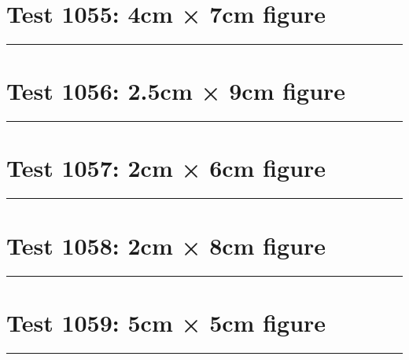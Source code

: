 \documentclass[a4paper,11pt]{article}
\begin{document}
\section*{Test 1055: 4cm × 7cm figure}
\begin{swarmwrap}%
  \begin{minipage}[t]{4cm}
    \centering
    \rule{\linewidth}{7cm}
  \end{minipage}%
\end{swarmwrap}%
\swarmwrapnext
\lipsum[13]
\lipsum[14]
\lipsum[15]
\section*{Test 1056: 2.5cm × 9cm figure}
\begin{swarmwrap}%
  \begin{minipage}[t]{2cm}
    \centering
    \rule{\linewidth}{9cm}
  \end{minipage}%
\end{swarmwrap}%
\swarmwrapnext
\lipsum[106]
\lipsum[107]
\lipsum[108]
\lipsum[109]
\section*{Test 1057: 2cm × 6cm figure}
\begin{swarmwrap}%
  \begin{minipage}[t]{2cm}
    \centering
    \rule{\linewidth}{6cm}
  \end{minipage}%
\end{swarmwrap}%
\swarmwrapnext
\lipsum[50]
\lipsum[51]
\lipsum[52]
\lipsum[53]
\section*{Test 1058: 2cm × 8cm figure}
\begin{swarmwrap}%
  \begin{minipage}[t]{2cm}
    \centering
    \rule{\linewidth}{8cm}
  \end{minipage}%
\end{swarmwrap}%
\swarmwrapnext
\lipsum[119]
\lipsum[120]
\lipsum[121]
\lipsum[122]
\section*{Test 1059: 5cm × 5cm figure}
\begin{swarmwrap}%
  \begin{minipage}[t]{5cm}
    \centering
    \rule{\linewidth}{5cm}
  \end{minipage}%
\end{swarmwrap}%
\swarmwrapnext
\lipsum[29]
\lipsum[30]
\lipsum[31]
\lipsum[32]
\lipsum[33]
\end{document}

